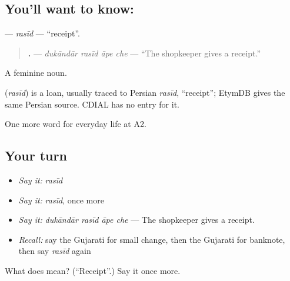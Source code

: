 \subsection*{You'll want to know: }
\textbf{} — \emph{rasīd} — \textquotedblleft{}receipt\textquotedblright{}.

\begin{quote}
\textbf{   .} — \emph{dukāndār rasīd āpe che} — \textquotedblleft{}The shopkeeper gives a receipt.\textquotedblright{}
\end{quote}

A feminine noun.

\begin{cousinweb}
\textbf{} (\emph{rasīd}) is a loan, usually traced to Persian \emph{rasīd}, \textquotedblleft{}receipt\textquotedblright{}; EtymDB gives the same Persian source. CDIAL has no entry for it.
\end{cousinweb}

\begin{grammarlens}[title={What you've built}]
One more word for everyday life at A2.
\end{grammarlens}

\subsection*{Your turn}
\begin{itemize}
\raggedright
  \item \emph{Say it:} \emph{rasīd}
  \item \emph{Say it:} \emph{rasīd}, once more
  \item \emph{Say it:} \emph{dukāndār rasīd āpe che} — The shopkeeper gives a receipt.
  \item \emph{Recall:} say the Gujarati for small change, then the Gujarati for banknote, then say \emph{rasīd} again
\end{itemize}

\begin{tcolorbox}[breakable,colback=teal!4,colframe=teal!35!black,title={Before you move on}]
What does  mean? (\textquotedblleft{}Receipt\textquotedblright{}.) Say it once more.
\end{tcolorbox}
